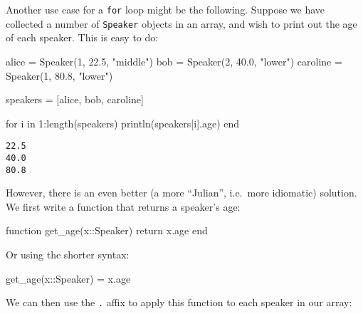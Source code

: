 \documentclass[
  letterpaper,
  DIV=11,
  numbers=noendperiod]{scrartcl}
\newenvironment{Shaded}{\begin{snugshade}}{\end{snugshade}}
\newcommand{\ControlFlowTok}[1]{\textcolor[rgb]{0.00,0.23,0.31}{#1}}
\newcommand{\DataTypeTok}[1]{\textcolor[rgb]{0.68,0.00,0.00}{#1}}
\newcommand{\FloatTok}[1]{\textcolor[rgb]{0.68,0.00,0.00}{#1}}
\newcommand{\FunctionTok}[1]{\textcolor[rgb]{0.28,0.35,0.67}{#1}}
\newcommand{\KeywordTok}[1]{\textcolor[rgb]{0.00,0.23,0.31}{#1}}
\newcommand{\NormalTok}[1]{\textcolor[rgb]{0.00,0.23,0.31}{#1}}
\newcommand{\OperatorTok}[1]{\textcolor[rgb]{0.37,0.37,0.37}{#1}}
\newcommand{\StringTok}[1]{\textcolor[rgb]{0.13,0.47,0.30}{#1}}
\begin{document}
Another use case for a \texttt{for} loop might be the following. Suppose
we have collected a number of \texttt{Speaker} objects in an array, and
wish to print out the age of each speaker. This is easy to do:

\begin{Shaded}
\begin{Highlighting}[]
\NormalTok{alice }\OperatorTok{=} \FunctionTok{Speaker}\NormalTok{(}\FloatTok{1}\NormalTok{, }\FloatTok{22.5}\NormalTok{, }\StringTok{"middle"}\NormalTok{)}
\NormalTok{bob }\OperatorTok{=} \FunctionTok{Speaker}\NormalTok{(}\FloatTok{2}\NormalTok{, }\FloatTok{40.0}\NormalTok{, }\StringTok{"lower"}\NormalTok{)}
\NormalTok{caroline }\OperatorTok{=} \FunctionTok{Speaker}\NormalTok{(}\FloatTok{1}\NormalTok{, }\FloatTok{80.8}\NormalTok{, }\StringTok{"lower"}\NormalTok{)}

\NormalTok{speakers }\OperatorTok{=}\NormalTok{ [alice, bob, caroline]}

\ControlFlowTok{for}\NormalTok{ i }\KeywordTok{in} \FloatTok{1}\OperatorTok{:}\FunctionTok{length}\NormalTok{(speakers)}
  \FunctionTok{println}\NormalTok{(speakers[i].age)}
\ControlFlowTok{end}
\end{Highlighting}
\end{Shaded}

\begin{verbatim}
22.5
40.0
80.8
\end{verbatim}

However, there is an even better (a more ``Julian'', i.e.~more
idiomatic) solution. We first write a function that returns a speaker's
age:

\begin{Shaded}
\begin{Highlighting}[]
\KeywordTok{function} \FunctionTok{get\_age}\NormalTok{(x}\OperatorTok{::}\DataTypeTok{Speaker}\NormalTok{)}
  \ControlFlowTok{return}\NormalTok{ x.age}
\KeywordTok{end}
\end{Highlighting}
\end{Shaded}

Or using the shorter syntax:

\begin{Shaded}
\begin{Highlighting}[]
\FunctionTok{get\_age}\NormalTok{(x}\OperatorTok{::}\DataTypeTok{Speaker}\NormalTok{) }\OperatorTok{=}\NormalTok{ x.age}
\end{Highlighting}
\end{Shaded}

We can then use the \texttt{.} affix to apply this function to each
speaker in our array:
\end{document}
